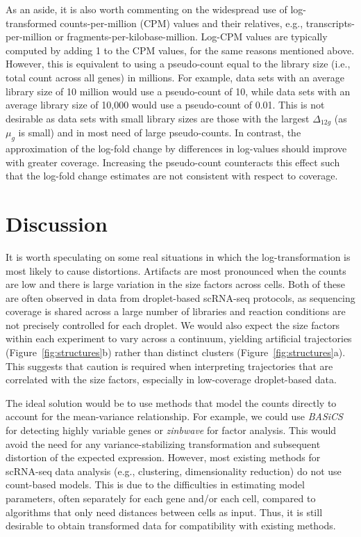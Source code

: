 \documentclass[10pt,letterpaper]{article}
\begin{document}
As an aside, it is also worth commenting on the widespread use of log-transformed counts-per-million (CPM) values and their relatives, e.g., transcripts-per-million or fragments-per-kilobase-million.
Log-CPM values are typically computed by adding 1 to the CPM values, for the same reasons mentioned above.
However, this is equivalent to using a pseudo-count equal to the library size (i.e., total count across all genes) in millions.
For example, data sets with an average library size of 10 million would use a pseudo-count of 10, while data sets with an average library size of 10,000 would use a pseudo-count of 0.01.
This is not desirable as data sets with small library sizes are those with the largest $\Delta_{12g}$ (as $\mu_g$ is small) and in most need of large pseudo-counts.
In contrast, the approximation of the log-fold change by differences in log-values should improve with greater coverage.
Increasing the pseudo-count counteracts this effect such that the log-fold change estimates are not consistent with respect to coverage.

\section{Discussion}
It is worth speculating on some real situations in which the log-transformation is most likely to cause distortions.
Artifacts are most pronounced when the counts are low and there is large variation in the size factors across cells.
Both of these are often observed in data from droplet-based scRNA-seq protocols, as sequencing coverage is shared across a large number of libraries and reaction conditions are not precisely controlled for each droplet.
We would also expect the size factors within each experiment to vary across a continuum, yielding artificial trajectories (Figure~\ref{fig:structures}b) rather than distinct clusters (Figure~\ref{fig:structures}a).
This suggests that caution is required when interpreting trajectories that are correlated with the size factors, especially in low-coverage droplet-based data.

The ideal solution would be to use methods that model the counts directly to account for the mean-variance relationship.
For example, we could use \textit{BASiCS} \cite{vallejos2016beyond} for detecting highly variable genes or \textit{zinbwave} \cite{risso2018general} for factor analysis.
This would avoid the need for any variance-stabilizing transformation and subsequent distortion of the expected expression.
However, most existing methods for scRNA-seq data analysis (e.g., clustering, dimensionality reduction) do not use count-based models.
This is due to the difficulties in estimating model parameters, often separately for each gene and/or each cell,
compared to algorithms that only need distances between cells as input.
Thus, it is still desirable to obtain transformed data for compatibility with existing methods.
\end{document}
